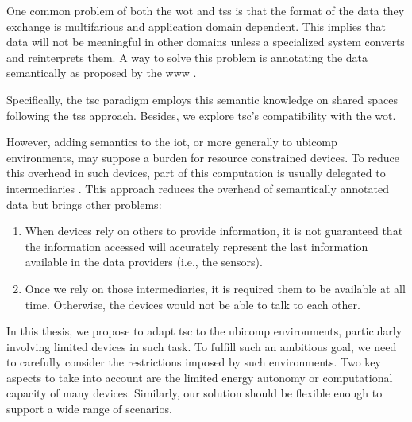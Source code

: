 \medskip

One common problem of both the \ac{wot} and \aclp{ts} is that the format of the data they exchange is multifarious and application domain dependent.
This implies that data will not be meaningful in other domains unless a specialized system converts and reinterprets them.
A way to solve this problem is annotating the data semantically as proposed by the \ac{www} \citep{berners-lee_semantic_2001}.

Specifically, the \ac{tsc} paradigm \citep{fensel_triple-space_2004} employs this semantic knowledge on shared spaces following the \aclp{ts} approach.
Besides, we explore \ac{tsc}'s compatibility with the \ac{wot}.

However, adding semantics to the \ac{iot}, or more generally to \ac{ubicomp} environments, may suppose a burden for resource constrained devices.
To reduce this overhead in such devices, part of this computation is usually delegated to intermediaries \citep{honkola_smart-m3_2010}. %
This approach reduces the overhead of semantically annotated data but brings other problems:
\begin{enumerate}
 \item When devices rely on others to provide information, it is not guaranteed that the information accessed will accurately represent the last information available in the data providers (i.e., the sensors).
 \item Once we rely on those intermediaries, it is required them to be available at all time.
	Otherwise, the devices would not be able to talk to each other.
\end{enumerate}

In this thesis, we propose to adapt \ac{tsc} to the \ac{ubicomp} environments, particularly involving limited devices in such task.
To fulfill such an ambitious goal, we need to carefully consider the restrictions imposed by such environments.
Two key aspects to take into account are the limited energy autonomy or computational capacity of many devices.
Similarly, our solution should be flexible enough to support a wide range of scenarios.


